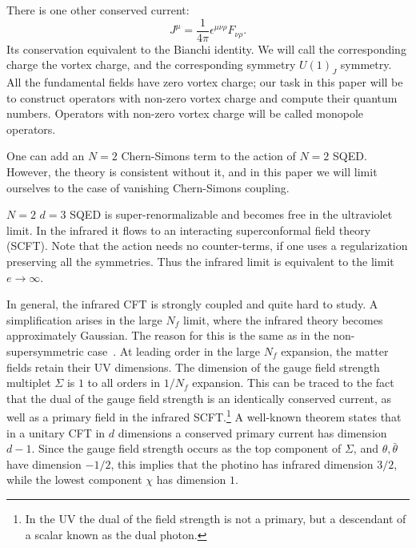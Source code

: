 \documentclass[a4paper,12pt, amsfonts, amssymb]{article}
\newcommand{\ra}{\rightarrow}
\newcommand{\eps}{\epsilon}
\newcommand{\btheta}{{\bar \theta}}
\begin{document}
There is one other conserved current: 
$$
J^\mu=\frac{1}{4\pi} \eps^{\mu\nu\rho} F_{\nu\rho}.
$$ 
Its conservation equivalent to the Bianchi identity.
We will call the corresponding charge the vortex charge, and
the corresponding symmetry $U(1)_J$ symmetry. 
All the fundamental fields have zero vortex charge; our task in this
paper will be to construct operators with non-zero vortex charge
and compute their quantum numbers. Operators with non-zero vortex
charge will be called monopole operators.

One can add an $N=2$ Chern-Simons term to the action of $N=2$ SQED. However,
the theory is consistent without it, and in this paper we will limit
ourselves to the case of vanishing Chern-Simons coupling. 

$N=2$ $d=3$ SQED is super-renormalizable and becomes free in the ultraviolet
limit. In the infrared it flows to an interacting superconformal field
theory (SCFT). Note that the action needs no counter-terms,
if one uses a regularization preserving all the symmetries. Thus the infrared
limit is equivalent to the limit $e\ra\infty$.

In general, the infrared CFT is strongly coupled and quite hard to study.
A simplification arises in the large $N_f$ limit, where the infrared
theory becomes approximately Gaussian. The reason for this is the same as in
the non-supersymmetric case~\cite{BKWone}. At leading order in the large $N_f$
expansion, the matter fields retain their UV dimensions. The dimension
of the gauge field strength multiplet 
$\Sigma$ is $1$ to all orders in $1/N_f$ expansion. This can be traced to the fact that the dual of the gauge field strength is an identically conserved current, as well as a primary field in the infrared 
SCFT.\footnote{In the UV the dual of the field strength is not a primary, but a descendant of a scalar known as the dual photon.} A well-known
theorem states that in a unitary CFT in $d$ dimensions a conserved primary
current has dimension $d-1$. Since the gauge field strength occurs as the
top component of $\Sigma$, and $\theta,\btheta$ have dimension $-1/2$, this
implies that the photino has infrared dimension $3/2$, while the lowest
component $\chi$ has dimension $1$.
\end{document}
